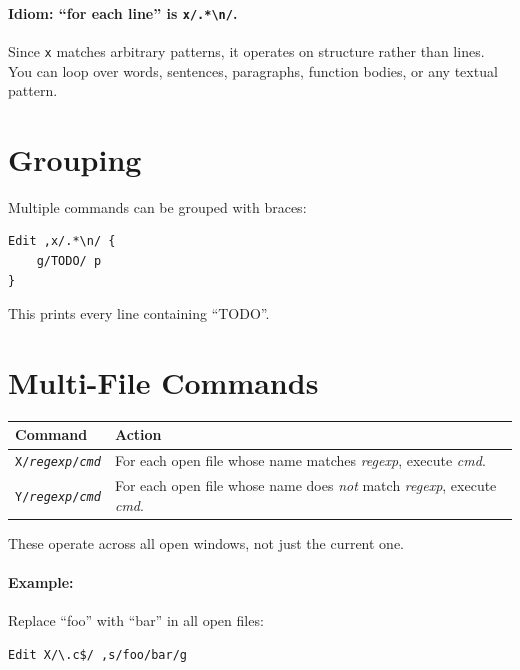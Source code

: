\paragraph{Idiom: ``for each line'' is \texttt{x/.*\textbackslash n/}.}

Since \texttt{x} matches arbitrary patterns, it operates on structure
rather than lines.  You can loop over words, sentences, paragraphs,
function bodies, or any textual pattern.

\section{Grouping}
\label{sec:grouping}


Multiple commands can be grouped with braces:

\begin{Verbatim}[frame=single]
Edit ,x/.*\n/ {
    g/TODO/ p
}
\end{Verbatim}

\noindent
This prints every line containing ``TODO''.

\section{Multi-File Commands}
\label{sec:multifile}


\begin{longtable}{@{}lp{3.5in}@{}}
\toprule
Command & Action \\
\midrule
\endhead
\texttt{X/\textit{regexp}/\textit{cmd}} & For each open file whose
  name matches \textit{regexp}, execute \textit{cmd}. \\
\texttt{Y/\textit{regexp}/\textit{cmd}} & For each open file whose
  name does \emph{not} match \textit{regexp}, execute \textit{cmd}. \\
\bottomrule
\end{longtable}

\noindent
These operate across all open windows, not just the current one.

\paragraph{Example:} Replace ``foo'' with ``bar'' in all open 
files:

\begin{Verbatim}[frame=single]
Edit X/\.c$/ ,s/foo/bar/g
\end{Verbatim}

